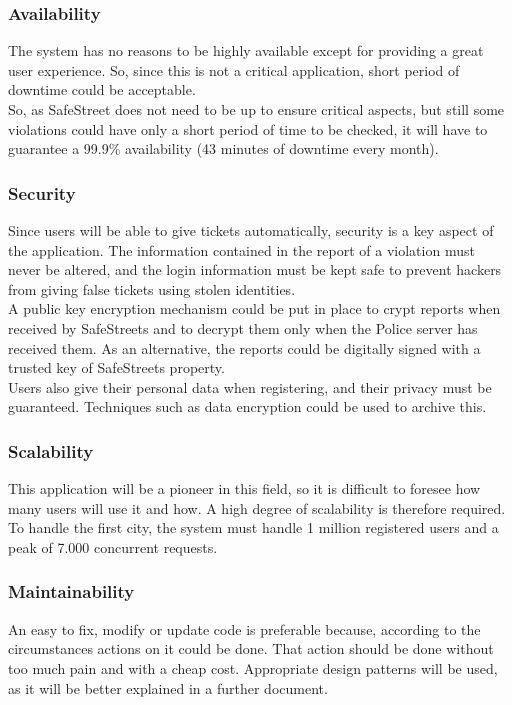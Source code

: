 \subsubsection{Availability}
	The system has no reasons to be highly available except for providing a great
user experience. So, since this is not a critical application, short period of downtime could be acceptable.\\
	So, as SafeStreet does not need to be up to ensure critical aspects, but still some violations could have only a short period of time to be checked, it will have to guarantee a 99.9\% availability (43 minutes of downtime every month).

\subsubsection{Security}
    Since users will be able to give tickets automatically, security is a key aspect of the application.
    The information contained in the report of a violation must never be altered, and the login information
    must be kept safe to prevent hackers from giving false tickets using stolen identities.\\
    A public key encryption mechanism could be put in place to crypt reports when received by SafeStreets and to decrypt them only when the Police server has received them. As an alternative, the reports could be digitally signed with a trusted key of SafeStreets property.\\
  	Users also give their personal data when registering, and their privacy must be guaranteed. Techniques such as data encryption could be used to archive this.

\subsubsection{Scalability}
    This application will be a pioneer in this field, so it is difficult to foresee how many users will
    use it and how. A high degree of scalability is therefore required. To handle the first city,
    the system must handle 1 million registered users and a peak of 7.000 concurrent requests.
    
\subsubsection{Maintainability}
	An easy	to	fix, modify or update code is preferable because,	according	to	the	circumstances actions on it could be done. That action should be done without too much pain and with a cheap cost.		
	Appropriate	design	patterns	will	be	used,	as	it	will	be	better	explained	in	a	further	document.    
	
